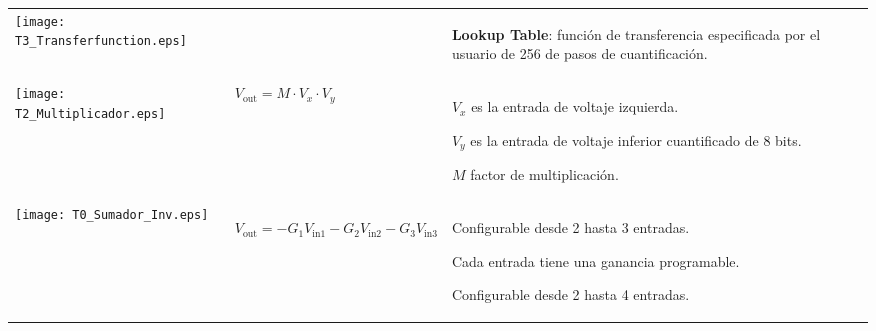 \begin{table}[!ht]
\begin{tabular}{>{\centering\arraybackslash}m{3cm} >{\centering\arraybackslash}m{5cm} >{\centering\arraybackslash}m{5cm}}
	    \texttt{[image: T3\_Transferfunction.eps]}
	    &
	    & 
	      \begin{itemize}[leftmargin=0cm,noitemsep]
	      \begin{scriptsize}
			\item[] \textbf{Lookup Table}: función de transferencia especificada por el usuario de 256 de pasos de cuantificación.  
	      \end{scriptsize}
	      \end{itemize}
	    \\ %
	    {\scriptsize \textbf{Multiplier}} \linebreak
	    \texttt{[image: T2\_Multiplicador.eps]}
	    &
	      $V_{\mathrm{out}} = M \cdot V_{x} \cdot V_{y}$
	    & 
	      \begin{itemize}[leftmargin=0cm,noitemsep]
	      \begin{scriptsize}
			\item[] $V_{x}$ es la entrada de voltaje izquierda.
			\item[] $V_{y}$ es la entrada de voltaje inferior cuantificado de 8 bits.
			\vspace{-0.15cm}
			\item[] $M$ factor de multiplicación.
	      \end{scriptsize}
	      \end{itemize}
	   \\ %
	    {\scriptsize \textbf{SumInv}} \linebreak
	    \texttt{[image: T0\_Sumador\_Inv.eps]}
	    &
	      \begin{footnotesize}
	      	$V_{\mathrm{out}} = - G_{1} V_{\mathrm{in1}} - G_{2} V_{\mathrm{in2}} - G_{3} V_{\mathrm{in3}}$
	      \end{footnotesize}
	    & 
	      \begin{itemize}[leftmargin=0cm,noitemsep]
	      \begin{scriptsize}
			\item[] Configurable desde 2 hasta 3 entradas.
			\item[]	Cada entrada tiene una ganancia programable.
			\vspace{-0.15cm}
			\item[] Configurable desde 2 hasta 4 entradas. 
	      \end{scriptsize}
	      \end{itemize}
	    \\ %

\end{tabular}
\end{table}
